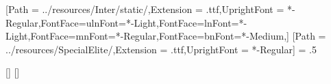 \usepackage[
  paper=a4paper,
  layout=a4paper,
  top=20mm,
  bottom=22mm,
  left=30mm,
  right=30mm,
  marginparsep=5mm,
  marginparwidth=20mm,
  head=5mm,
  foot=10mm
  ]{geometry}

\usepackage{fontspec}
\setmainfont{Inter}[Path = ../resources/Inter/static/,Extension = .ttf,UprightFont = *-Regular,FontFace={ul}{n}{Font=*-Light},FontFace={l}{n}{Font=*-Light},FontFace={m}{n}{Font=*-Regular},FontFace={b}{n}{Font=*-Medium},]
\DeclareRobustCommand{\ulseries}{\fontseries{ul}\selectfont}
\DeclareRobustCommand{\lseries}{\fontseries{l}\selectfont}
\DeclareRobustCommand{\mseries}{\fontseries{m}\selectfont}
\DeclareRobustCommand{\mbseries}{\fontseries{mb}\selectfont}
\DeclareRobustCommand{\bseries}{\fontseries{b}\selectfont}
\DeclareRobustCommand{\ebseries}{\fontseries{eb}\selectfont}
\DeclareTextFontCommand{\textul}{\ulseries}
\DeclareTextFontCommand{\textl}{\lseries}
\DeclareTextFontCommand{\textm}{\mseries}
\DeclareTextFontCommand{\textmb}{\mbseries}
\DeclareTextFontCommand{\textb}{\bseries}
\DeclareTextFontCommand{\texteb}{\ebseries}
\setsansfont{SpecialElite}[Path = ../resources/SpecialElite/,Extension = .ttf,UprightFont = *-Regular]
\linespread{1.075}
\parskip = .5\baselineskip

\usepackage{lastpage}

\newcommand\thexab{Arbetsblad X}
\newcommand\xab[1]{\renewcommand\thexab{Arbetsblad #1}}

\let\paragraph\oldparagraph
\let\subparagraph\oldsubparagraph
\usepackage{titlesec}
\titlespacing{\section}{0pt}{0pt}{0pt}
[\large\sffamily]{
\sethead{}{}{\textcolor{red}{100\% respekt}}
\setfoot{\rmfamily\small\thepage/\pageref*{LastPage}}{}{}
}
[\large\sffamily]{
\sethead{}{}{\textcolor{red}{100\% respekt}}
}
\newcommand\xturn{\thispagestyle{respektTurn}\pagebreak}
\pagestyle{respekt}

